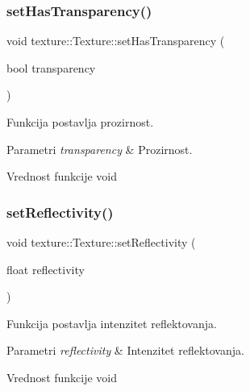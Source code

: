 \subsubsection{\texorpdfstring{set\+Has\+Transparency()}{setHasTransparency()}}
{\footnotesize\ttfamily void texture\+::\+Texture\+::set\+Has\+Transparency (\begin{DoxyParamCaption}\item[{bool}]{transparency }\end{DoxyParamCaption})}



Funkcija postavlja prozirnost. 


\begin{DoxyParams}{Parametri}
{\em transparency} & Prozirnost. \\
\hline
\end{DoxyParams}
\begin{DoxyReturn}{Vrednost funkcije}
void 
\end{DoxyReturn}
\mbox{\label{classtexture_1_1Texture_aff2b95ba459704df9e0cb83f753c03e9}} 
\subsubsection{\texorpdfstring{set\+Reflectivity()}{setReflectivity()}}
{\footnotesize\ttfamily void texture\+::\+Texture\+::set\+Reflectivity (\begin{DoxyParamCaption}\item[{float}]{reflectivity }\end{DoxyParamCaption})}



Funkcija postavlja intenzitet reflektovanja. 


\begin{DoxyParams}{Parametri}
{\em reflectivity} & Intenzitet reflektovanja. \\
\hline
\end{DoxyParams}
\begin{DoxyReturn}{Vrednost funkcije}
void 
\end{DoxyReturn}
\mbox{\label{classtexture_1_1Texture_a46165b592ed1f20ef8b5409dce41300d}} 
